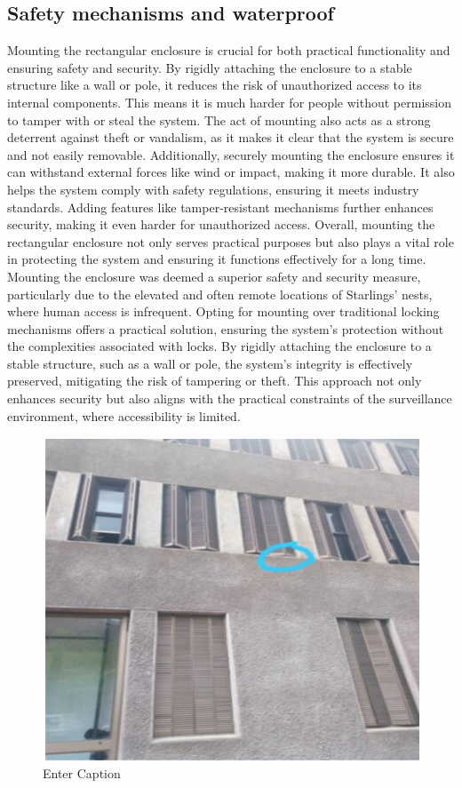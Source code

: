\documentclass[class=report,11pt,crop=false]{standalone}
\begin{document}
\subsection{Safety mechanisms and waterproof}
Mounting the rectangular enclosure is crucial for both practical functionality and ensuring safety and security. By rigidly attaching the enclosure to a stable structure like a wall or pole, it reduces the risk of unauthorized access to its internal components. This means it is much harder for people without permission to tamper with or steal the system. The act of mounting also acts as a strong deterrent against theft or vandalism, as it makes it clear that the system is secure and not easily removable. Additionally, securely mounting the enclosure ensures it can withstand external forces like wind or impact, making it more durable. It also helps the system comply with safety regulations, ensuring it meets industry standards. Adding features like tamper-resistant mechanisms further enhances security, making it even harder for unauthorized access. Overall, mounting the rectangular enclosure not only serves practical purposes but also plays a vital role in protecting the system and ensuring it functions effectively for a long time.
Mounting the enclosure was deemed a superior safety and security measure, particularly due to the elevated and often remote locations of Starlings' nests, where human access is infrequent. Opting for mounting over traditional locking mechanisms offers a practical solution, ensuring the system's protection without the complexities associated with locks. By rigidly attaching the enclosure to a stable structure, such as a wall or pole, the system's integrity is effectively preserved, mitigating the risk of tampering or theft. This approach not only enhances security but also aligns with the practical constraints of the surveillance environment, where accessibility is limited.


\begin{figure}[H]
    \centering
    \includegraphics[width=0.5\linewidth]{final-report/Images/nest.png}
    \caption{Enter Caption}
    \label{fig:enter-label}
\end{figure}
\end{document}
